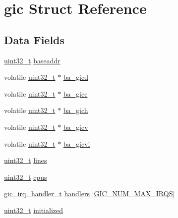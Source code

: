 \hypertarget{structgic}{\section{gic \-Struct \-Reference}
\label{structgic}
}
\subsection*{\-Data \-Fields}
\begin{DoxyCompactItemize}
\item 
\hyperlink{arch__types_8h_a435d1572bf3f880d55459d9805097f62}{uint32\-\_\-t} \hyperlink{structgic_ab15249e04d1bee1b0997011912a87cbf}{baseaddr}
\item 
volatile \hyperlink{arch__types_8h_a435d1572bf3f880d55459d9805097f62}{uint32\-\_\-t} $\ast$ \hyperlink{structgic_a186421525f3bd36a65216cfdc79ce10e}{ba\-\_\-gicd}
\item 
volatile \hyperlink{arch__types_8h_a435d1572bf3f880d55459d9805097f62}{uint32\-\_\-t} $\ast$ \hyperlink{structgic_a83c305aab314213445ac83ad517e9be4}{ba\-\_\-gicc}
\item 
volatile \hyperlink{arch__types_8h_a435d1572bf3f880d55459d9805097f62}{uint32\-\_\-t} $\ast$ \hyperlink{structgic_aa93c957a17fef2d6779bde6b08f85050}{ba\-\_\-gich}
\item 
volatile \hyperlink{arch__types_8h_a435d1572bf3f880d55459d9805097f62}{uint32\-\_\-t} $\ast$ \hyperlink{structgic_acd803bc08a11a6e6222a8a156390599f}{ba\-\_\-gicv}
\item 
volatile \hyperlink{arch__types_8h_a435d1572bf3f880d55459d9805097f62}{uint32\-\_\-t} $\ast$ \hyperlink{structgic_a0dc2d2fdf039752758490aa59725fce2}{ba\-\_\-gicvi}
\item 
\hyperlink{arch__types_8h_a435d1572bf3f880d55459d9805097f62}{uint32\-\_\-t} \hyperlink{structgic_af6e49f2b9eca7c6ee734d83fdc035124}{lines}
\item 
\hyperlink{arch__types_8h_a435d1572bf3f880d55459d9805097f62}{uint32\-\_\-t} \hyperlink{structgic_a148b00861c88b4f5d5bf006071fbdc04}{cpus}
\item 
\hyperlink{gic_8h_a4b1f3150431142b6910f651a1172f446}{gic\-\_\-irq\-\_\-handler\-\_\-t} \hyperlink{structgic_a030df411878f4e7c744256f330692e95}{handlers} \mbox{[}\hyperlink{gic_8h_a1ae8d5cca4dfb10e3503d0acd68ea045}{\-G\-I\-C\-\_\-\-N\-U\-M\-\_\-\-M\-A\-X\-\_\-\-I\-R\-Q\-S}\mbox{]}
\item 
\hyperlink{arch__types_8h_a435d1572bf3f880d55459d9805097f62}{uint32\-\_\-t} \hyperlink{structgic_a874884c7efa14474f67d1a82b795ce3c}{initialized}
\end{DoxyCompactItemize}


